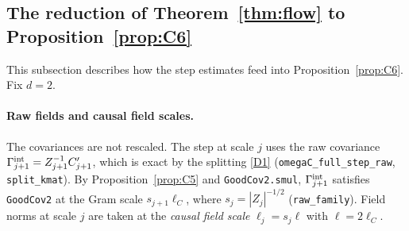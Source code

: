 \documentclass[11pt]{amsart}
\theoremstyle{definition}
\theoremstyle{remark}
\numberwithin{equation}{section}
\begin{document}
\subsection{The reduction of Theorem~\ref{thm:flow} to Proposition~\ref{prop:C6}}
\label{sec:reduction}
This subsection describes how the step estimates feed into Proposition~\ref{prop:C6}. Fix $d=2$.

\paragraph{Raw fields and causal field scales.} The covariances are not rescaled. The step at
scale $j$ uses the raw covariance $\Gamma^{\rm int}_{j+1}=Z_{j+1}^{-1}C'_{j+1}$, which is exact by
the splitting \ref{D1} (\texttt{omegaC\_full\_step\_raw}, \texttt{split\_kmat}). By
Proposition~\ref{prop:C5} and \texttt{GoodCov2.smul}, $\Gamma^{\rm int}_{j+1}$ satisfies
\texttt{GoodCov2} at the Gram scale $s_{j+1}\ell_C$, where $s_j=|Z_j|^{-1/2}$ (\texttt{raw\_family}).
Field norms at scale $j$ are taken at the \emph{causal field scale} $\ell_j=s_j\ell$ with $\ell=2\ell_C$.
\end{document}
